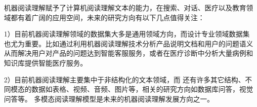 机器阅读理解赋予了计算机阅读理解文本的能力，在搜索、对话、医疗以及教育领域都有着广阔的应用空间，未来的研究方向有以下几点值得关注：

1）目前机器阅读理解领域的数据集大多是通用领域方向，而设计专业领域数据集也尤为重要。比如通过利用机器阅读理解技术分析产品说明文档和用户的问题语义从而解决用户对产品的问题达到智能客服服务，或者在医疗诊断中分析大量病例和知识库提供智能医疗服务。


2）目前机器阅读理解主要集中于非结构化的文本领域，而
还有许多其它结构、不同模态的数据如表格、视频、音频、图片等，相关的研究方向如数据库问答，视觉问答等。
多模态阅读理解模型是未来的机器阅读理解发展方向之一。






















